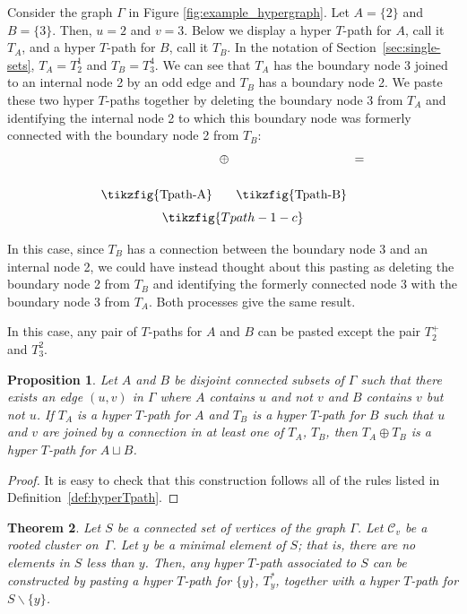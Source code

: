 \documentclass[pdftex]{sigma}
\numberwithin{equation}{section}
\newtheorem{Theorem}{Theorem}[section]
\newtheorem{Proposition}[Theorem]{Proposition}
 { \theoremstyle{definition}
\newtheorem{Definition}[Theorem]{Definition}
\newtheorem{Note}[Theorem]{Note}
\newtheorem{Example}[Theorem]{Example}
\newtheorem{Remark}[Theorem]{Remark} }
\begin{document}
\begin{Example}
Consider the graph $\Gamma$ in Figure \ref{fig:example_hypergraph}. Let $A = \{2\}$ and $B = \{3\}$. Then, $u = 2$ and $v = 3$. Below we display a hyper $T$-path for $A$, call it $T_A$, and a hyper $T$-path for $B$, call it $T_B$. In the notation of Section~\ref{sec:single-sets}, $T_A = T_2^1$ and $T_B = T_3^4$. We can see that $T_A$ has the boundary node 3 joined to an internal node 2 by an odd edge and $T_B$ has a boundary node 2. We paste these two hyper $T$-paths together by deleting the boundary node 3 from $T_A$ and identifying the internal node 2 to which this boundary node was formerly connected with the boundary node 2 from $T_B$:
$$\raisebox{-0.4in}{\tikzfig{Tpath-A}}\ \oplus \ \raisebox{-0.4in}{\tikzfig{Tpath-B}} \ =$$
$$\tikzfig{Tpath-1-c}$$

In this case, since $T_B$ has a connection between the boundary node 3 and an internal node 2, we could have instead thought about this pasting as deleting the boundary node 2 from $T_B$ and identifying the formerly connected node 3 with the boundary node 3 from $T_A$. Both processes give the same result.

In this case, any pair of $T$-paths for $A $ and $B$ can be pasted except the pair $T_2^+$ and $T_3^2$.
\end{Example}

\begin{Proposition}\label{prop:pasting}
Let $A$ and $B$ be disjoint connected subsets of $\Gamma$ such that there exists an edge $(u,v)$ in $\Gamma$ where $A$ contains $u$ and not $v$ and $B$ contains $v$ but not $u$. If $T_A$ is a hyper $T$-path for $A$ and $T_B$ is a hyper $T$-path for $B$ such that $u$ and $v$ are joined by a connection in at least one of $T_A$, $T_B$, then $T_A\oplus T_B$ is a hyper $T$-path for $A \sqcup B$.
\end{Proposition}

\begin{proof}
It is easy to check that this construction follows all of the rules listed in Defini\-tion~\ref{def:hyperTpath}.
\end{proof}

\begin{Theorem}\label{thm:CanPeelSingleton}
Let $S$ be a connected set of vertices of the graph $\Gamma$. Let $\mathcal{C}_v$ be a rooted cluster on~$\Gamma$. Let $y$ be a minimal element of $S$; that is, there are no elements in $S$ less than $y$. Then, any hyper $T$-path associated to $S$ can be constructed by pasting a hyper $T$-path for $\{ y \}$, $T_{y}^*$, together with a hyper $T$-path for $S \backslash \{ y \}$.
\end{Theorem}
\end{document}
